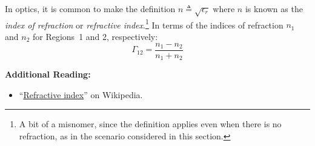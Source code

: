 In optics, it is common to make the definition $n\triangleq \sqrt{\epsilon_r}$ where $n$ is known as the \emph{index of refraction} 
or \emph{refractive index}.\footnote{A bit of a misnomer, since the definition applies even when there is no refraction, as in the scenario considered in this section.}
In terms of the indices of refraction $n_1$ and $n_2$ for Regions~1 and 2, respectively:
%
\begin{equation}
\Gamma_{12} = \frac{n_1-n_2}{n_1+n_2}
\end{equation}


{\bf Additional Reading:}
\begin{itemize}
\item ``\href{https://en.wikipedia.org/wiki/Refractive_index}{Refractive index}'' on Wikipedia.
\end{itemize}




